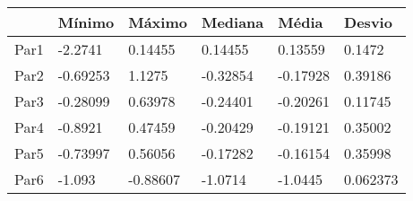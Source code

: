 \begin{tabular}{llllll}
& Mínimo & Máximo & Mediana & Média & Desvio \\ 
\hline 
Par1 & -2.2741 & 0.14455 & 0.14455 & 0.13559 & 0.1472 \\ 
Par2 & -0.69253 & 1.1275 & -0.32854 & -0.17928 & 0.39186 \\ 
Par3 & -0.28099 & 0.63978 & -0.24401 & -0.20261 & 0.11745 \\ 
Par4 & -0.8921 & 0.47459 & -0.20429 & -0.19121 & 0.35002 \\ 
Par5 & -0.73997 & 0.56056 & -0.17282 & -0.16154 & 0.35998 \\ 
Par6 & -1.093 & -0.88607 & -1.0714 & -1.0445 & 0.062373 \\ 
\hline 
\end{tabular}